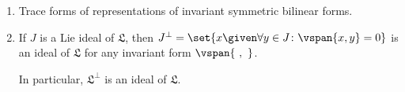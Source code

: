 \begin{enumerate}[label=(\roman*)]
	\item Trace forms of representations of invariant symmetric bilinear forms.
	\item If $J$ is a Lie ideal of $\mathfrak{L}$, then $J^{\perp} = \set{x\given \forall y \in J\colon \vspan{x, y} = 0}$
		is an ideal of $\mathfrak{L}$ for any invariant form $\vspan{\ ,\ }$.

		In particular, $\mathfrak{L}^{\perp}$ is an ideal of $\mathfrak{L}$.
\end{enumerate}
